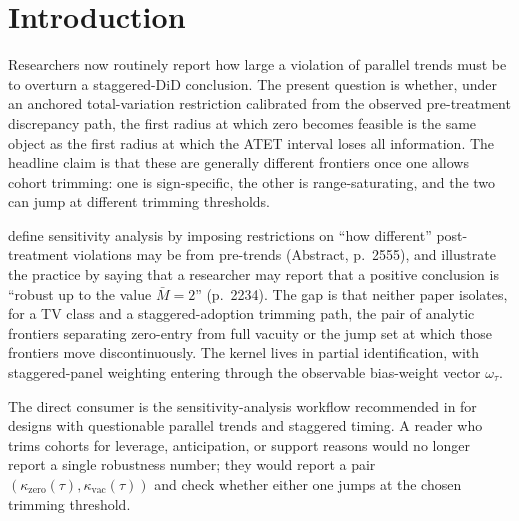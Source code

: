 \documentclass[11pt]{article}
\theoremstyle{definition}
\theoremstyle{plain}
\theoremstyle{remark}
\begin{document}
\section{Introduction}
Researchers now routinely report how large a violation of parallel trends must be to overturn a staggered-DiD conclusion. The present question is whether, under an anchored total-variation restriction calibrated from the observed pre-treatment discrepancy path, the first radius at which zero becomes feasible is the same object as the first radius at which the ATET interval loses all information. The headline claim is that these are generally different frontiers once one allows cohort trimming: one is sign-specific, the other is range-saturating, and the two can jump at different trimming thresholds.

\citet{RambachanRoth2023CrediblePT} define sensitivity analysis by imposing restrictions on ``how different'' post-treatment violations may be from pre-trends (Abstract, p.~2555), and \citet{RothSantAnnaBilinskiPoe2023TrendingDiD} illustrate the practice by saying that a researcher may report that a positive conclusion is ``robust up to the value $\bar M = 2$'' (p.~2234). The gap is that neither paper isolates, for a TV class and a staggered-adoption trimming path, the pair of analytic frontiers separating zero-entry from full vacuity or the jump set at which those frontiers move discontinuously. The kernel lives in partial identification, with staggered-panel weighting entering through the observable bias-weight vector \(\omega_\tau\).

The direct consumer is the sensitivity-analysis workflow recommended in \citet{RothSantAnnaBilinskiPoe2023TrendingDiD} for designs with questionable parallel trends and staggered timing. A reader who trims cohorts for leverage, anticipation, or support reasons would no longer report a single robustness number; they would report a pair \((\kappa_{\mathrm{zero}}(\tau),\kappa_{\mathrm{vac}}(\tau))\) and check whether either one jumps at the chosen trimming threshold.
\end{document}
